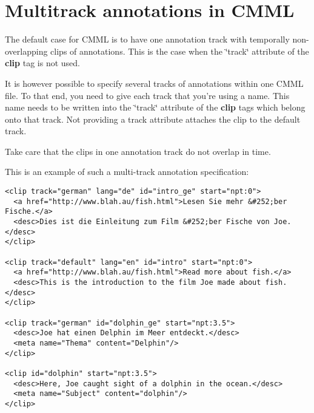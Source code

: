 \section{Multitrack annotations in CMML}
\label{group__multicliptrack}
The default case for CMML is to have one annotation track with temporally non-overlapping clips of annotations. This is the case when the \char`\"{}track\char`\"{} attribute of the {\bf clip} tag is not used.

It is however possible to specify several tracks of annotations within one CMML file. To that end, you need to give each track that you're using a name. This name needs to be written into the \char`\"{}track\char`\"{} attribute of the {\bf clip} tags which belong onto that track. Not providing a track attribute attaches the clip to the default track.

Take care that the clips in one annotation track do not overlap in time.

This is an example of such a multi-track annotation specification: 

\footnotesize\begin{verbatim}
<clip track="german" lang="de" id="intro_ge" start="npt:0">
  <a href="http://www.blah.au/fish.html">Lesen Sie mehr &#252;ber Fische.</a>
  <desc>Dies ist die Einleitung zum Film &#252;ber Fische von Joe.</desc>
</clip>

<clip track="default" lang="en" id="intro" start="npt:0">
  <a href="http://www.blah.au/fish.html">Read more about fish.</a>
  <desc>This is the introduction to the film Joe made about fish.</desc>
</clip>

<clip track="german" id="dolphin_ge" start="npt:3.5">
  <desc>Joe hat einen Delphin im Meer entdeckt.</desc>
  <meta name="Thema" content="Delphin"/>
</clip>

<clip id="dolphin" start="npt:3.5">
  <desc>Here, Joe caught sight of a dolphin in the ocean.</desc>
  <meta name="Subject" content="dolphin"/>
</clip>
\end{verbatim}
\normalsize

